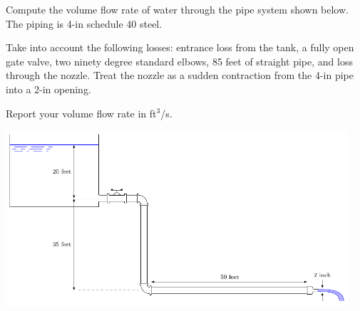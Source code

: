 \documentclass[multi,preview,varwidth=false,border=5,12pt]{standalone}
\begin{document}
\begin{question}

Compute the volume flow rate of water through the pipe system shown below.
The piping is 4-in schedule 40 steel.

Take into account the following losses: entrance loss from the tank, a fully open gate valve, two ninety degree standard elbows, 85 feet of straight pipe, and loss through the nozzle.  Treat the nozzle as a sudden contraction from the 4-in pipe into a 2-in opening.

Report your volume flow rate in ft$^3$/s.

\includegraphics[width=5in]{imgs/TankGateElbows.pdf}


\begin{solution}

\end{solution}

\end{question}
\end{document}
